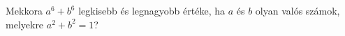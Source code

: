 Mekkora $a^{6}+b^{6}$ legkisebb és legnagyobb értéke, ha 
$a$ és $b$ olyan valós számok, melyekre $a^{2}+b^{2}=1$?
